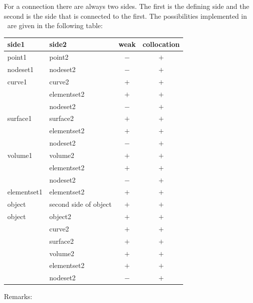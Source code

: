 For a connection there are always two sides. The first is the defining side
and the second is the side that is connected to the first.
The possibilities implemented in \tfem\ are
given in the following table:
\begin{center}
\begin{tabular}{llcc}
side1 & side2 & weak & collocation \\\hline
point1 & point2 & $-$ & $+$ \\
nodeset1 & nodeset2 & $-$ & $+$ \\
curve1 & curve2 & $+$ & $+$  \\
      & elementset2 & $+$ & $+$ \\
      & nodeset2 & $-$ & $+$ \\
surface1 & surface2 & $+$ & $+$  \\
        & elementset2 & $+$ & $+$ \\
      & nodeset2 & $-$ & $+$ \\
volume1 & volume2 & $+$ & $+$  \\
        & elementset2 & $+$ & $+$ \\
      & nodeset2 & $-$ & $+$ \\
elementset1 & elementset2 & $+$ & $+$  \\
object & second side of object & $+$ & $+$  \\
object & object2 & $+$ & $+$  \\
       & curve2 & $+$ & $+$  \\
       & surface2 & $+$ & $+$  \\
       & volume2 & $+$ & $+$  \\
       & elementset2 & $+$ & $+$ \\
       & nodeset2 & $-$ & $+$ 
\end{tabular}
\end{center}
Remarks:
